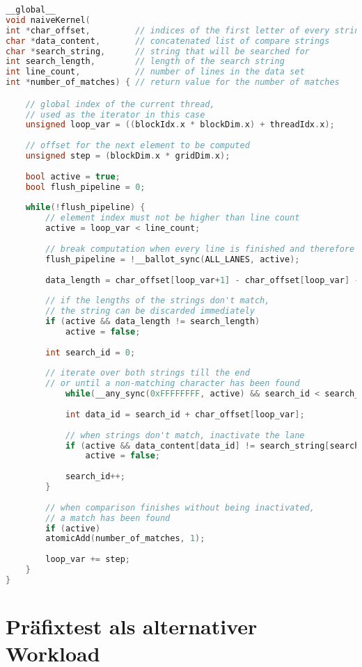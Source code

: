 \begin{lstlisting}[language=C++,
	caption=Naive Implementierung des String-Vergleichs,
	label=naive_equals]
__global__
void naiveKernel(
int *char_offset,         // indices of the first letter of every string
char *data_content,       // concatenated list of compare strings 
char *search_string,      // string that will be searched for
int search_length,        // length of the search string
int line_count,           // number of lines in the data set
int *number_of_matches) { // return value for the number of matches

	// global index of the current thread,
	// used as the iterator in this case
	unsigned loop_var = ((blockIdx.x * blockDim.x) + threadIdx.x);
	
	// offset for the next element to be computed
	unsigned step = (blockDim.x * gridDim.x);
	
	bool active = true;
	bool flush_pipeline = 0;
	
	while(!flush_pipeline) {
		// element index must not be higher than line count
		active = loop_var < line_count;
		
		// break computation when every line is finished and therefore inactive
		flush_pipeline = !__ballot_sync(ALL_LANES, active);
		
		data_length = char_offset[loop_var+1] - char_offset[loop_var] - 1;
		
		// if the lengths of the strings don't match,
		// the string can be discarded immediately
		if (active && data_length != search_length)
			active = false;
		
		int search_id = 0;
		
		// iterate over both strings till the end
		// or until a non-matching character has been found
			while(__any_sync(0xFFFFFFFF, active) && search_id < search_length) {
			
			int data_id = search_id + char_offset[loop_var];
			
			// when strings don't match, inactivate the lane
			if (active && data_content[data_id] != search_string[search_id])
				active = false;
			
			search_id++;
		}
		
		// when comparison finishes without being inactivated, 
		// a match has been found 
		if (active)
		atomicAdd(number_of_matches, 1);
		
		loop_var += step;
	}
}
\end{lstlisting}

\section{Präfixtest als alternativer Workload}
